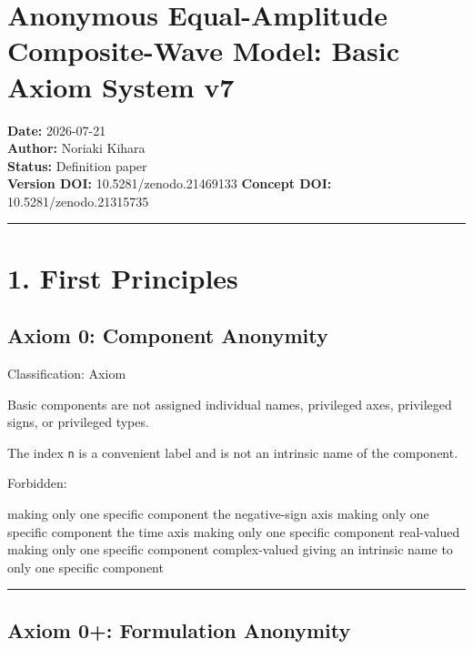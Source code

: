 \documentclass[
  a4paper,
]{article}
\author{}
\date{}
\newenvironment{Shaded}{}{}
\newcommand{\NormalTok}[1]{#1}
\begin{document}
\section{Anonymous Equal-Amplitude Composite-Wave Model: Basic Axiom
System
v7}\label{anonymous-equal-amplitude-composite-wave-model-basic-axiom-system-v7}

\textbf{Date:} 2026-07-21\\
\textbf{Author:} Noriaki Kihara\\
\textbf{Status:} Definition paper\\
\textbf{Version DOI:} 10.5281/zenodo.21469133 \textbf{Concept DOI:}
10.5281/zenodo.21315735

\begin{center}\rule{0.5\linewidth}{0.5pt}\end{center}

\section{1. First Principles}\label{first-principles}

\subsection{Axiom 0: Component
Anonymity}\label{axiom-0-component-anonymity}

Classification: Axiom

Basic components are not assigned individual names, privileged axes,
privileged signs, or privileged types.

The index \texttt{n} is a convenient label and is not an intrinsic name
of the component.

Forbidden:

\begin{Shaded}
\begin{Highlighting}[]
\NormalTok{making only one specific component the negative{-}sign axis}
\NormalTok{making only one specific component the time axis}
\NormalTok{making only one specific component real{-}valued}
\NormalTok{making only one specific component complex{-}valued}
\NormalTok{giving an intrinsic name to only one specific component}
\end{Highlighting}
\end{Shaded}

\begin{center}\rule{0.5\linewidth}{0.5pt}\end{center}

\subsection{Axiom 0+: Formulation
Anonymity}\label{axiom-0-formulation-anonymity}
\end{document}
